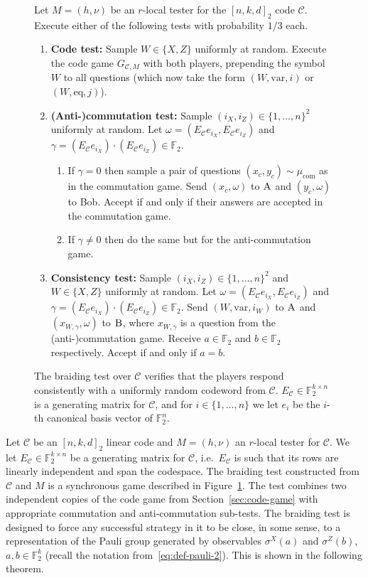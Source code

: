 \documentclass[11pt]{article}
\theoremstyle{definition}
\newcommand{\code}{\mathscr{C}}
\newcommand{\field}{\mathbb{F}_2}
\newcommand{\F}{\ensuremath{\mathbb{F}}}
\newcommand{\cc}{\mathrm{com}}
\newcommand{\eq}{\mathrm{eq}}
\newcommand{\var}{\mathrm{var}}
\newcommand{\labelstyle}[1]{\ensuremath{\textsc{#1}}\xspace}
\newcommand{\alice}{\labelstyle{A}}
\newcommand{\bob}{\labelstyle{B}}
\newenvironment{gamespec}{
  \begin{mdframed}[style=figstyle]}{
  \end{mdframed}}
\begin{document}
\begin{figure}[!htbp]
  \centering
  \begin{gamespec}
Let $M=(h,\nu)$ be an $r$-local tester for the $[n,k,d]_2$ code $\code$.  Execute either of the following tests with probability $1/3$ each. 
    \begin{enumerate}
      \setlength\itemsep{1pt}
    \item \textbf{Code test:} Sample $W\in \{X,Z\}$ uniformly at random. Execute the code game $G_{\code,M}$ with both players, prepending the symbol $W$ to all questions (which now take the form $(W,\var,i)$ or $(W,\eq,j)$). 
		
    \item \textbf{(Anti-)commutation test:} Sample $(i_X,i_Z)\in \{1,\ldots,n\}^2 $ uniformly at random. Let $\omega = (E_\code e_{i_X}, E_\code e_{i_Z})$ and $\gamma =  (E_\code e_{i_X}) \cdot(E_\code e_{i_Z}) \in \field$. 
		\begin{enumerate} 
		\item If $\gamma=0$ then sample a pair of questions $(x_c,y_c)\sim\mu_\cc$ as in the commutation game. Send $(x_c,\omega)$ to $\alice$ and $(y_c,\omega)$ to Bob. Accept if and only if their answers are accepted in the commutation game. 
		\item If $\gamma\neq 0$ then do the same but for the anti-commutation game. 
		\end{enumerate} 
		 \item \textbf{Consistency test:} Sample $(i_X,i_Z)\in \{1,\ldots,n\}^2 $ and $W\in \{X,Z\}$ uniformly at random. Let $\omega=(E_\code e_{i_X}, E_\code e_{i_Z})$ and $\gamma = (E_\code e_{i_X}) \cdot(E_\code e_{i_Z}) \in \field$. Send $(W,\var,i_W)$ to $\alice$ and $(x_{W,\gamma},\omega)$ to $\bob$, where $x_{W,\gamma}$ is a question from the (anti-)commutation game. Receive $a\in \field$ and $b\in \field$ respectively. Accept if and only if $a=b$. 
    \end{enumerate}
  \end{gamespec}
  \caption{The braiding test over $\code$ verifies that the players respond consistently with a uniformly random codeword from $\code$. $E_\code \in \F_2^{k\times n}$ is a generating matrix for $\code$, and for $i\in\{1,\ldots,n\}$ we let $e_i$ be the $i$-th canonical basis vector of $\F_2^n$.}
  \label{fig:braiding-test}
\end{figure}

Let $\code$ be an $[n,k,d]_2$ linear code and $M=(h,\nu)$ an $r$-local tester for $\code$. We let $E_\code\in\F_2^{k\times n}$ be a generating matrix for $\code$, i.e.\ $E_\code$ is such that its rows are linearly independent and span the codespace. 
 The braiding test constructed from $\code$ and $M$ is a synchronous game described in Figure~\ref{fig:braiding-test}. The test combines two independent copies of the code game from Section~\ref{sec:code-game} with appropriate commutation and anti-commutation sub-tests. The braiding test is designed to force any successful strategy in it to be close, in some sense, to a representation of the Pauli group generated by observables $\sigma^X(a)$ and $\sigma^Z(b)$, $a,b\in \F_2^k$ (recall the notation from~\eqref{eq:def-pauli-2}). This is shown in the following theorem. 
\end{document}
